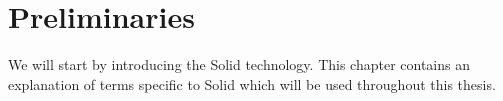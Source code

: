 \chapter{Preliminaries}
We will start by introducing the Solid technology.
This chapter contains an explanation of terms specific to Solid which will be used throughout this thesis.







